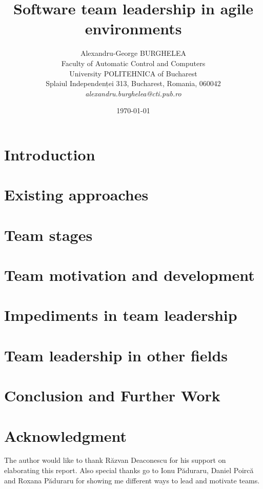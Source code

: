 \documentclass[12pt]{article}
\title{Software team leadership in agile environments}
\author{Alexandru-George BURGHELEA\\
Faculty of Automatic Control and Computers\\
University POLITEHNICA of Bucharest\\
Splaiul Independenței 313, Bucharest, Romania, 060042 \\
\emph{alexandru.burghelea@cti.pub.ro}}
\date{\today}
\begin{document}
\maketitle

\begin{abstract}

\end{abstract}

\section{Introduction}
\label{sec:introduction}


\section{Existing approaches}
\label{sec:existingapproaches}


\section{Team stages}
\label{sec:teamstages}


\section{Team motivation and development}
\label{sec:teamdevelopment}


\section{Impediments in team leadership}
\label{sec:impediments}


\section{Team leadership in other fields}
\label{sec:otherfields}


\section{Conclusion and Further Work}
\label{sec:conclusion}


\section*{Acknowledgment}
\label{sec:acknowledgment}
The author would like to thank R\u{a}zvan Deaconescu for his support on elaborating this report. Also special thanks go to Ionu P\u{a}duraru, Daniel Poirc\u{a} and Roxana P\u{a}duraru for showing me different ways to lead and motivate teams.



\end{document}
